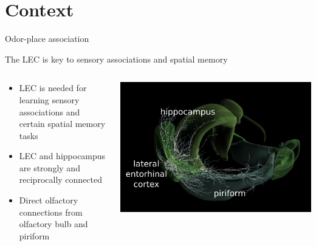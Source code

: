 \documentclass[bigger]{beamer}
\begin{document}
\section*{Context}
\label{sec:org2c29495}
{%
\begin{frame}[fragile]{Odor-place association}
\addtocounter{framenumber}{-1}
\end{frame}
}
\begin{frame}[<+->][label={sec:org6ba3ff6}]{The LEC is key to sensory associations and spatial memory}
\begin{columns}
\begin{column}{0.45\columnwidth}
\footnotesize
\begin{itemize}
\item \alert{LEC} is needed for learning sensory associations and certain spatial memory tasks
\item \alert{LEC} and \alert{hippocampus} are strongly and reciprocally connected
\item Direct olfactory connections from \alert{olfactory bulb} and \alert{piriform}
\end{itemize}
\end{column}
\begin{column}{0.55\columnwidth}
\begin{center}
\includegraphics[width=\textwidth]{img/brain.png}
\end{center}
\end{column}
\end{columns}
\end{frame}
\end{document}
